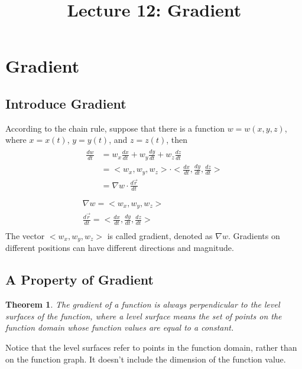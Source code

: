 \documentclass{article}
\title{Lecture 12: Gradient}
\author{}
\date{}
\newtheorem*{theorem}{Theorem}
\begin{document}
    
\maketitle

\section{Gradient}

\subsection{Introduce Gradient}

According to the chain rule, suppose that there is a function $w = w(x, y, z)$, 
where $x = x(t)$, $y = y(t)$, and $z = z(t)$, then
\begin{gather*}
  \begin{split}
    \frac{dw}{dt} &= w_x \frac{dx}{dt} + w_y \frac{dy}{dt} + w_z \frac{dz}{dt} \\
                  &= <w_x, w_y, w_z> \cdot <\frac{dx}{dt}, \frac{dy}{dt}, \frac{dz}{dt}> \\
                  &= \nabla w \cdot \frac{d\vec{r}}{dt} \\
  \end{split} \\
  \nabla w = <w_x, w_y, w_z> \\
  \frac{d\vec{r}}{dt} = <\frac{dx}{dt}, \frac{dy}{dt}, \frac{dz}{dt}> \\
\end{gather*}
The vector $<w_x, w_y, w_z>$ is called gradient, denoted as $\nabla w$. 
Gradients on different positions can have different directions and magnitude.

\subsection{A Property of Gradient}

\begin{theorem}
  The gradient of a function is always perpendicular to the level surfaces of 
  the function, where a level surface means the set of points on the function 
  domain whose function values are equal to a constant.
\end{theorem}
Notice that the level surfaces refer to points in the function domain, rather 
than on the function graph. It doesn't include the dimension of the function 
value.
\end{document}
